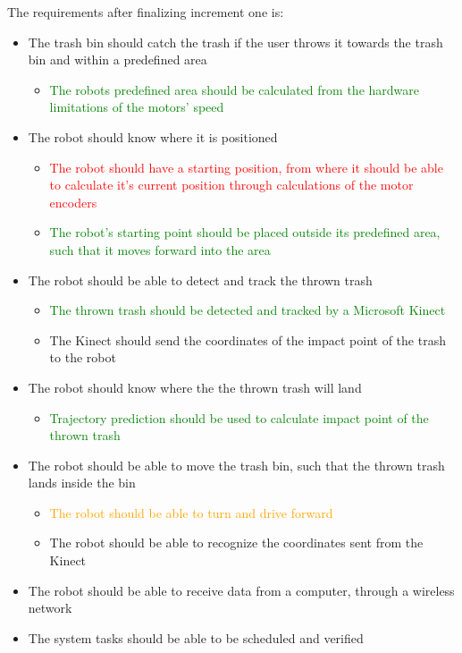 The requirements after finalizing increment one is:
\begin{itemize}
\item The trash bin should catch the trash if the user throws it towards the trash bin and within a predefined area
\begin{itemize}
	\item \textcolor{green}{The robots predefined area should be calculated from the hardware limitations of the motors’ speed}
\end{itemize}
\item The robot should know where it is positioned
\begin{itemize}
	\item \textcolor{red}{The robot should have a starting position, from where it should be able to calculate it's current position through calculations of the motor encoders}
	\item \textcolor{green}{The robot's starting point should be placed outside its predefined area, such that it moves forward into the area}
\end{itemize}
\item The robot should be able to detect and track the thrown trash
\begin{itemize}
	\item \textcolor{green}{The thrown trash should be detected and tracked by a Microsoft Kinect}
	\item The Kinect should send the coordinates of the impact point of the trash to the robot
\end{itemize}
\item The robot should know where the the thrown trash will land
\begin{itemize}
	\item \textcolor{green}{Trajectory prediction should be used to calculate impact point of the thrown trash}
\end{itemize}
\item The robot should be able to move the trash bin, such that the thrown trash lands inside the bin
\begin{itemize}
	\item \textcolor{orange}{The robot should be able to turn and drive forward}
	\item {The robot should be able to recognize the coordinates sent from the Kinect}
\end{itemize}
\item {The robot should be able to receive data from a computer, through a wireless network}
\item {The system tasks should be able to be scheduled and verified}
\end{itemize}
